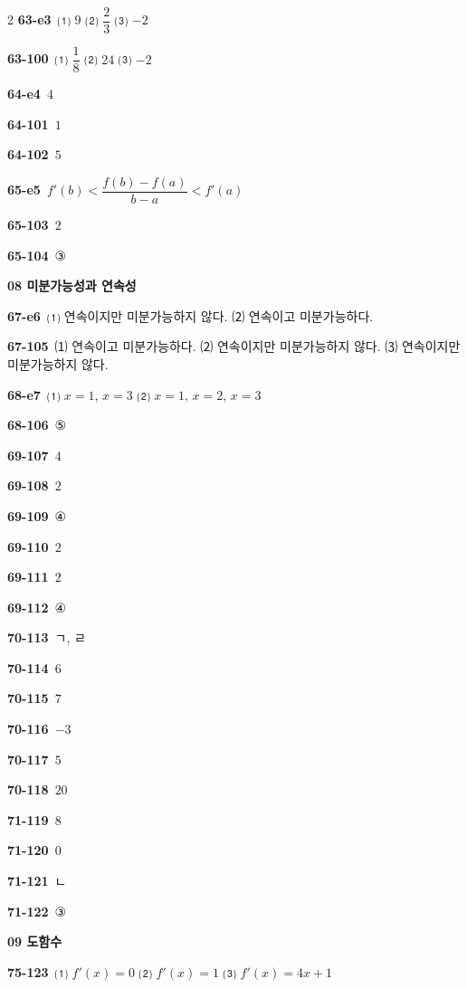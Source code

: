 \documentclass[10pt,a4paper]{article}
\begin{document}
\begin{multicols}{2}
\noindent\textbf{63-e3}\ ⑴ $9$ ⑵ $\dfrac{2}{3}$ ⑶ $-2$\par
\noindent\textbf{63-100}\ ⑴ $\dfrac{1}{8}$ ⑵ $24$ ⑶ $-2$\par
\noindent\textbf{64-e4}\ $4$\par
\noindent\textbf{64-101}\ $1$\par
\noindent\textbf{64-102}\ $5$\par
\noindent\textbf{65-e5}\ $f'(b)<\dfrac{f(b)-f(a)}{b-a}<f'(a)$\par
\noindent\textbf{65-103}\ $2$\par
\noindent\textbf{65-104}\ ③\par
\noindent\textbf{08 미분가능성과 연속성}\par\smallskip
\noindent\textbf{67-e6}\ ⑴ 연속이지만 미분가능하지 않다. ⑵ 연속이고 미분가능하다.\par
\noindent\textbf{67-105}\ ⑴ 연속이고 미분가능하다. ⑵ 연속이지만 미분가능하지 않다. ⑶ 연속이지만 미분가능하지 않다.\par
\noindent\textbf{68-e7}\ ⑴ $x=1$, $x=3$ ⑵ $x=1$, $x=2$, $x=3$\par
\noindent\textbf{68-106}\ ⑤\par
\noindent\textbf{69-107}\ $4$\par
\noindent\textbf{69-108}\ $2$\par
\noindent\textbf{69-109}\ ④\par
\noindent\textbf{69-110}\ $2$\par
\noindent\textbf{69-111}\ $2$\par
\noindent\textbf{69-112}\ ④\par
\noindent\textbf{70-113}\ ㄱ, ㄹ\par
\noindent\textbf{70-114}\ $6$\par
\noindent\textbf{70-115}\ $7$\par
\noindent\textbf{70-116}\ $-3$\par
\noindent\textbf{70-117}\ $5$\par
\noindent\textbf{70-118}\ $20$\par
\noindent\textbf{71-119}\ $8$\par
\noindent\textbf{71-120}\ $0$\par
\noindent\textbf{71-121}\ ㄴ\par
\noindent\textbf{71-122}\ ③\par
\noindent\textbf{09 도함수}\par\smallskip
\noindent\textbf{75-123}\ ⑴ $f'(x)=0$ ⑵ $f'(x)=1$ ⑶ $f'(x)=4x+1$\par

\end{multicols}
\end{document}
